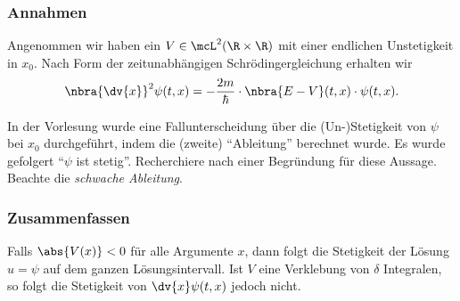 \documentclass{subfiles}
\begin{document}
    \subsubsection*{Annahmen}
        Angenommen wir haben ein $V\in\mcL^2(\R\times\R)$ mit einer endlichen Unstetigkeit in $x_0$. Nach Form der zeitunabhängigen Schrödingergleichung erhalten wir
        \[\nbra{\dv{x}}^2\psi(t,x) = -\frac{2m}{\hbar}\cdot\nbra{E-V}(t,x)\cdot\psi(t,x).\]

        \begin{Aufgabe}
            \nr{} In der Vorlesung wurde eine Fallunterscheidung über die (Un-)Stetigkeit von $\psi$ bei $x_0$ durchgeführt, indem die (zweite) \enquote{Ableitung} berechnet wurde. Es wurde gefolgert \enquote{$\psi$ ist stetig}. Recherchiere nach einer Begründung für diese Aussage. Beachte die \emph{schwache Ableitung}. 
        \end{Aufgabe}

    \subsubsection*{Zusammenfassen}
        Falls $\abs{V(x)}<0$ für alle Argumente $x$, dann folgt die Stetigkeit der Lösung $u = \psi$ auf dem ganzen Lösungsintervall. Ist $V$ eine Verklebung von $\delta$ Integralen, so folgt die Stetigkeit von $\dv{x}\psi(t,x)$ jedoch nicht. 
\end{document}

